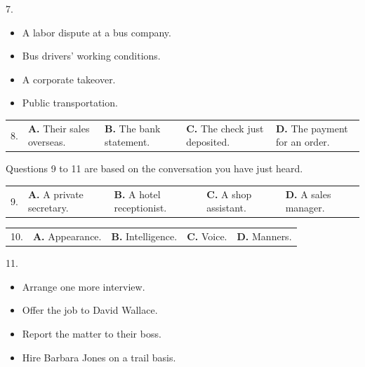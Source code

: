 \documentclass[UTF8,11pt]{ctexart}
\begin{document}
7.


\begin{itemize}[leftmargin=2em,itemsep=.2em,topsep=.4em]\item[A.] A labor dispute at a bus company.
\item[B.] Bus drivers’ working conditions.
\item[C.] A corporate takeover.
\item[D.] Public transportation.
\end{itemize}

\noindent\begin{tabularx}{\linewidth}{@{}lXXXX@{}}8. & \textbf{A.} Their sales overseas. & \textbf{B.} The bank statement. & \textbf{C.} The check just deposited. & \textbf{D.} The payment for an order.\\\end{tabularx}\par

Questions 9 to 11 are based on the conversation you have just heard.


\noindent\begin{tabularx}{\linewidth}{@{}lXXXX@{}}9. & \textbf{A.} A private secretary. & \textbf{B.} A hotel receptionist. & \textbf{C.} A shop assistant. & \textbf{D.} A sales manager.\\\end{tabularx}\par

\noindent\begin{tabularx}{\linewidth}{@{}lXXXX@{}}10. & \textbf{A.} Appearance. & \textbf{B.} Intelligence. & \textbf{C.} Voice. & \textbf{D.} Manners.\\\end{tabularx}\par

11.


\begin{itemize}[leftmargin=2em,itemsep=.2em,topsep=.4em]\item[A.] Arrange one more interview.
\item[C.] Offer the job to David Wallace.
\end{itemize}

\begin{itemize}[leftmargin=2em,itemsep=.2em,topsep=.4em]\item[B.] Report the matter to their boss.
\item[D.] Hire Barbara Jones on a trail basis.
\end{itemize}
\end{document}

